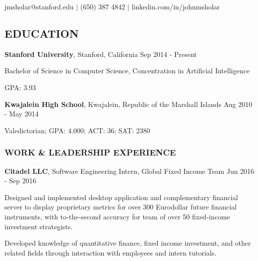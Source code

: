 \documentclass[11pt,letterpaper]{article}%
\begin{document}
\vspace{-1ex}
\centerline{jmsholar@stanford.edu $|$ (650) 387 4842 $|$ linkedin.com/in/johnmsholar}
\vspace{-1ex}

\hrulefill
\subsection*{EDUCATION}
\vspace{-1ex}
\hrulefill
\small

\hspace{.6em} 
{\bf Stanford University}, Stanford, California \hfill Sep 2014 - Present

\hspace{1.2em} 
{Bachelor of Science} in Computer Science, Concentration in Artificial Intelligence 

\hspace{1.2em} 
GPA: 3.93

\hspace{.6em} 
{\bf Kwajalein High School}, Kwajalein, Republic of the Marshall Islands \hfill Aug 2010 - May 2014

\hspace{1.2em} 
Valedictorian; GPA: 4.000; ACT: 36; SAT: 2380

\vspace{-.5em}
\hrulefill 
\subsubsection*{WORK \& LEADERSHIP EXPERIENCE}
\vspace{-1ex}
\hrulefill

\vspace{.3em}
\hspace{.6em} 
{\bf Citadel LLC}, Software Engineering Intern, Global Fixed Income Team \hfill Jun 2016 - Sep 2016
\vspace{-.6em}
\begin{itemize*}
\item 
Designed and implemented desktop application and complementary financial server  to display proprietary metrics for over 300 Eurodollar future financial instruments, with to-the-second accuracy for team of over 50 fixed-income investment strategists.
\item
Developed knowledge of quantitative finance, fixed income investment, and other related fields through interaction with employees and intern tutorials.
\end{itemize*}
\end{document}
